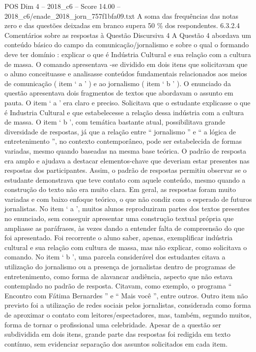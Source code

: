 \begin{textsample}{POS Dim 4 – 2018\_c6 – Score 14.00 – 2018\_c6/enade\_2018\_jorn\_757f1bfa09.txt}
A soma das frequências das notas zero e das questões deixadas em branco supera 50 \% dos respondentes. 6.3.2.4 Comentários sobre as respostas à Questão Discursiva 4 A Questão 4 abordava um conteúdo básico do campo da comunicação/jornalismo e sobre o qual o formando deve ter domínio : explicar o que é Indústria Cultural e sua relação com a cultura de massa.
O comando apresentava -se dividido em dois itens que solicitavam que o aluno conceituasse e analisasse conteúdos fundamentais relacionados aos meios de comunicação ( item ‘ a ’ ) e ao jornalismo ( item ‘ b ’ ).
O enunciado da questão apresentava dois fragmentos de textos que abordavam o assunto em pauta.
O item ‘ a ’ era claro e preciso.
Solicitava que o estudante explicasse o que é Industria Cultural e que estabelecesse a relação dessa indústria com a cultura de massa.
O item ‘ b ’, com temática bastante atual, possibilitava grande diversidade de respostas, já que a relação entre “ jornalismo ” e “ a lógica de entretenimento ”, no contexto contemporâneo, pode ser estabelecida de formas variadas, mesmo quando baseadas na mesma base teórica.
O padrão de resposta era amplo e ajudava a destacar elementos-chave que deveriam estar presentes nas respostas dos participantes.
Assim, o padrão de respostas permitiu observar se o estudante demonstrava que teve contato com aquele conteúdo, mesmo quando a construção do texto não era muito clara.
Em geral, as respostas foram muito variadas e com baixo enfoque teórico, o que não condiz com o esperado de futuros jornalistas.
No item ‘ a ’, muitos alunos reproduziram partes dos textos presentes no enunciado, sem conseguir apresentar uma construção textual própria que ampliasse as paráfrases, às vezes dando a entender falta de compreensão do que foi apresentado.
Foi recorrente o aluno saber, apenas, exemplificar indústria cultural e sua relação com cultura de massa, mas não explicar, como solicitava o comando.
No item ‘ b ’, uma parcela considerável dos estudantes citava a utilização do jornalismo ou a presença de jornalistas dentro de programas de entretenimento, como forma de alavancar audiência, aspecto que não estava contemplado no padrão de resposta.
Citavam, como exemplo, o programa “ Encontro com Fátima Bernardes ” e “ Mais você ”, entre outros.
Outro item não previsto foi a utilização de redes sociais pelos jornalistas, considerada como forma de aproximar o contato com leitores/espectadores, mas, também, segundo muitos, forma de tornar o profissional uma celebridade.
Apesar de a questão ser subdividida em dois itens, grande parte das respostas foi redigida em texto contínuo, sem evidenciar separação dos assuntos solicitados em cada item.

\end{textsample}

